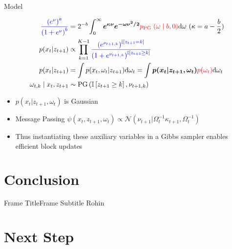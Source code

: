 \documentclass{beamer}
\begin{document}
\begin{frame}{Model}%
        \begin{tcolorbox}[colback=blue!10!white,colframe=blue!50!black,title=Polya-gamma augmentation\cite{linderman2015dependent},boxrule=2pt, boxsep=0.1em, left=0.1em, right=0.1em,
fontupper=\fontsize{8}{10}\selectfont]

\begin{align}
\textcolor{blue}{ \frac{\left(e^{\nu}\right)^{a}}{\left(1+e^{\nu}\right)^{b}} } &=2^{-b}  \int_{0}^{\infty} \boldsymbol{e^{\kappa \nu} e^{-\omega \nu^{2} / 2} }\textcolor{red} {  p_{\text {PG }}(\omega \mid b, 0) }\mathrm{d} \omega \text{ }(\kappa=a-\frac{b}{2})\\
p(x_{t}|z_{t+1}) &\propto \prod_{k=1}^{K-1} \textcolor{blue}{  \frac{\left(e^{\nu_{t+1, k}}\right)^{\mathbb{I}\left[z_{t+1}=k\right]}}{\left(1+e^{\nu_{t+1, k}}\right)^{\mathbb{I}\left[z_{t+1} \geq k\right]}} }\\
p(x_t|z_{t+1})&=\int p(x_t,\omega_t|z_{t+1})  \mathrm{d}\omega_t=\int   \boldsymbol{ p(x_t|z_{t+1},\omega_t) }\textcolor{red}{ p(\omega_t) } \mathrm{d}\omega_t  \\
\omega_{t, k} \mid x_{t}, z_{t+1} &\sim \operatorname{PG}\left(\mathbb{I}\left[z_{t+1} \geq k\right], \nu_{t+1, k}\right) 
\end{align}

\end{tcolorbox}
\begin{itemize}
\item $p(x_t|z_{t+1},\omega_t)$ is Gaussian 
\item Message Passing $\psi(x_t,z_{t+1},\omega_t) \propto \mathcal{N}(\nu_{t+1}|\Omega^{-1}_t \kappa_{t+1},\Omega^{-1}_t)$
\item Thus instantiating these auxiliary variables in a Gibbs
sampler enables efficient block updates
\end{itemize}

    \end{frame}


\section{Conclusion}

\begin{frame}{Frame Title}{Frame Subtitle}
        Rohin

    \end{frame}

\section{Next Step}
\end{document}
